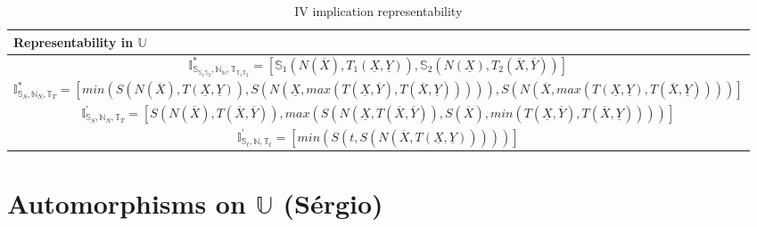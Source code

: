 \documentclass[conference]{IEEEtran}
\theoremstyle{plain}
\theoremstyle{remark}
\theoremstyle{definition}
\theoremstyle{proposition}
\newcommand{\UU}{\mathbb{U} }
\begin{document}
\begin{table*}[]
\centering
\caption{IV implication representability}
\label{tab:IVImplicationTable}
\begin{tabular}{l}
\textbf{Representability in $\mathbb{U}$}  %
\\ 
\hline  

 \begin{equation}\label{eq:t-representable}
\mathbb{I}^*_{\mathbb{S}_{\mathbb{S}_{1} \mathbb{S}_{2}},\mathbb{N}_\mathbb{N},\mathbb{T}_{\mathbb{T}_{1} \mathbb{T}_{2}}} = [\mathbb{S}_1 (N(\overline{X}), T_1(\underline{X}, \underline{Y})), 
\mathbb{S}_2 (N(\underline{X}), T_2(\overline{X}, \overline{Y}))]
\end{equation}
\\

\begin{equation}\label{eq:pseudo-t-representable}
\mathbb{I}^*_{\mathbb{S}_{S},\mathbb{N}_N,\mathbb{T}_T} = 
[min(S(N(\overline{X}), T(\underline{X}, \underline{Y})), S(N(\underline{X}, max(T(\underline{X}, \overline{Y}), T(\overline{X}, \underline{Y}))))), S(N(\overline{X}, max(T(\underline{X}, \underline{Y}), T(\overline{X}, \underline{Y}))))
]
\end{equation}
\\

\begin{equation}\label{eq:non-t-representable}
\mathbb{I}^{'}_{\mathbb{S}_{S},\mathbb{N}_N,\mathbb{T}_T} = 
[S(N(\overline{X}), T(\overline{X}, \overline{Y})), max(S(N(\underline{X}, T(\overline{X}, \overline{Y})), S(\overline{X}), min(T(\underline{X}, \overline{Y}), T(\overline{X}, \underline{Y}))))
]
\end{equation}
\\

\begin{equation}\label{eq:not-t-representable}
\mathbb{I}^{'}_{\mathbb{S}_{t},\mathbb{N},\mathbb{T}_t} = 
[min(S(t, S(N(\overline{X}, T(\underline{X}, \underline{Y})))))
]
\end{equation}

\end{tabular}
\end{table*}


\section{Automorphisms on $\UU$ (Sérgio)}
\end{document}
